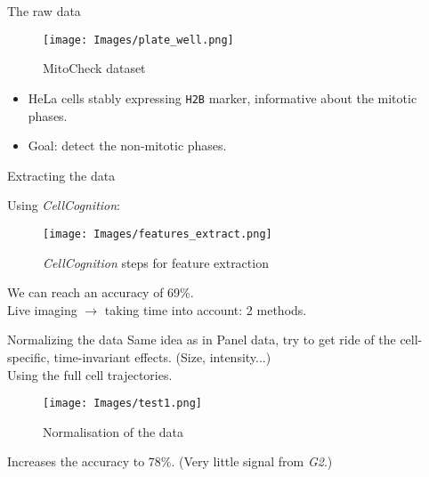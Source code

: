\documentclass{beamer}
\begin{document}
\begin{frame}{The raw data}
\begin{figure}[!ht]
\centering
\texttt{[image: Images/plate\_well.png]}
\caption{MitoCheck dataset}
\label{Mitocheck_well}
\end{figure}

\begin{itemize}
\item HeLa cells stably expressing \texttt{H2B} marker, informative about the mitotic phases.
\item Goal: detect the non-mitotic phases.
\end{itemize}
\end{frame}

\fi

\begin{frame}{Extracting the data}

Using \textit{CellCognition}:
\begin{figure}[!ht]
\centering
\texttt{[image: Images/features\_extract.png]}
\caption{\textit{CellCognition} steps for feature extraction}
\label{extract}
\end{figure}

We can reach an accuracy of 69\%. \\
Live imaging $\longrightarrow$ taking time into account: 2 methods.
\end{frame}

\iffalse

\begin{frame}{Nested Cross validation}
\begin{figure}[!ht]
\centering
\texttt{[image: Images/nest\_cv.jpg]}
\caption{Nested Cross validation}
\label{NestedCV}
\end{figure}
Upper biaises the accuracy! \\
Without the nested cross validation: 71\%. \\
With the nested cross validation: 69\%.
\end{frame}

\fi

\begin{frame}{Normalizing the data}
Same idea as in Panel data, try to get ride of the cell-specific, time-invariant effects. (Size, intensity...)\\
Using the full cell trajectories.

\begin{figure}[!ht]
\centering
\texttt{[image: Images/test1.png]}
\caption{Normalisation of the data}
\label{normalization}
\end{figure}

Increases the accuracy to 78\%. (Very little signal from \textit{G2}.)
\end{frame}
\end{document}
